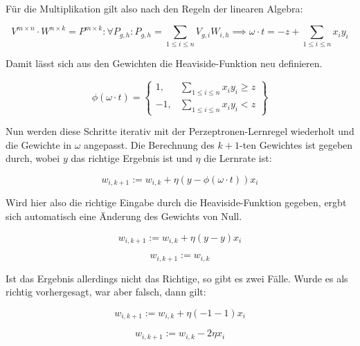 \documentclass[11pt]{article} %
\begin{document}
Für die Multiplikation gilt also nach den Regeln der linearen Algebra:

\begin{equation}
V^{m \times n} \cdot W^{n \times k} = P^{m \times k}: \forall P_{g,h} : P_{g,h} = \sum_{ 1 \leq i \leq n} V_{g,i} W_{i, h} \implies \omega \cdot t = -z + \sum_{1 \leq i \leq n} x_{i}y_{i}
\end{equation}

Damit lässt sich aus den Gewichten die Heaviside-Funktion neu definieren.

\begin{equation}
\phi(\omega \cdot t) = \begin{Bmatrix}
1, &  \sum_{1 \leq i \leq n} x_{i}y_{i} \geq z \\
-1, & \sum_{1 \leq i \leq n} x_{i}y_{i} < z
\end{Bmatrix} 
\end{equation}
 
Nun werden diese Schritte iterativ mit der Perzeptronen-Lernregel wiederholt und die Gewichte in $\omega$ angepasst. Die Berechnung des
$k+1$-ten Gewichtes ist gegeben durch, wobei $y$ das richtige Ergebnis ist und $\eta$ die Lernrate ist:

\begin{equation}
w_{i, k+1} := w_{i, k} + \eta ( y - \phi{(\omega \cdot t)}) x_{i}
\end{equation}

Wird hier also die richtige Eingabe durch die Heaviside-Funktion gegeben, ergbt sich automatisch eine Änderung des Gewichts von Null.

\begin{equation}
w_{i, k+1} := w_{i, k} + \eta ( y - y) x_{i}
\end{equation}

\begin{equation}
w_{i, k+1} := w_{i, k} 
\end{equation}

Ist das Ergebnis allerdings nicht das Richtige, so gibt es zwei Fälle. Wurde es als richtig vorhergesagt, war aber falsch, dann gilt:

\begin{equation}
w_{i, k+1} := w_{i, k} + \eta ( -1 -1 ) x_{i}
\end{equation}

\begin{equation}
w_{i, k+1} := w_{i, k} - 2 \eta x_{i}
\end{equation}
\end{document}
